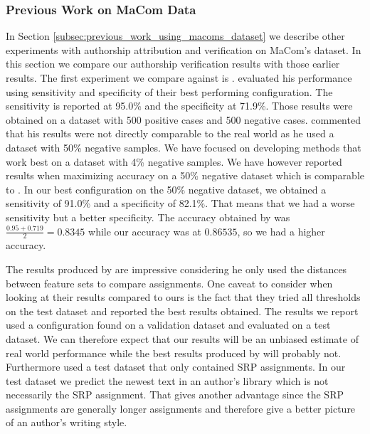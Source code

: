 \subsubsection{Previous Work on MaCom Data}

In Section \ref{subsec:previous_work_using_macoms_dataset} we describe other
experiments with authorship attribution and verification on MaCom's dataset.
In this section we compare our authorship verification results with those
earlier results. The first experiment we compare against is \citep{aalykke2016}.
\citet{aalykke2016} evaluated his performance using sensitivity and specificity
of their best performing configuration. The sensitivity is reported at 95.0\%
and the specificity at 71.9\%. Those results were obtained on a dataset with
500 positive cases and 500 negative cases. \citet{aalykke2016} commented that
his results were not directly comparable to the real world as he used a dataset
with 50\% negative samples. We have focused on developing methods that work 
best on a dataset with 4\% negative samples. We have however reported results
when maximizing accuracy on a 50\% negative dataset which is comparable to
\citep{aalykke2016}. In our best configuration on the 50\% negative dataset, we
obtained a sensitivity of 91.0\% and a specificity of 82.1\%. That means that
we had a worse sensitivity but a better specificity. The accuracy obtained by
\citet{aalykke2016} was $\frac{0.95 + 0.719}{2} = 0.8345$ while our accuracy was
at $0.86535$, so we had a higher accuracy.

The results produced by \citet{aalykke2016} are impressive considering he only
used the distances between feature sets to compare assignments. One caveat to
consider when looking at their results compared to ours is the fact that they
tried all thresholds on the test dataset and reported the best results obtained.
The results we report used a configuration found on a validation dataset and
evaluated on a test dataset. We can therefore expect that our results will be
an unbiased estimate of real world performance while the best results produced
by \citet{aalykke2016} will probably not. Furthermore \citet{aalykke2016} used
a test dataset that only contained \gls{SRP} assignments. In our test dataset
we predict the newest text in an author's library which is not necessarily the
\gls{SRP} assignment. That gives \citet{aalykke2016} another advantage since
the \gls{SRP} assignments are generally longer assignments and therefore give a
better picture of an author's writing style.

